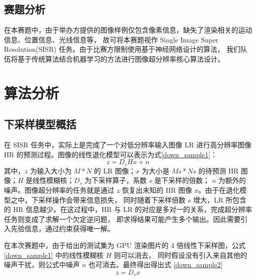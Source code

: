 \documentclass[12pt, a4paper, oneside]{ctexbook}
\begin{document}
	\subsection{赛题分析}
	在本赛题中，由于举办方提供的图像样例仅包含像素信息，缺失了渲染相关的运动信息、位置信息、光线信息等，
	故可将本赛题视作 Single Image Super Resolution(SISR) 任务。由于比赛方限制使用基于神经网络设计的算法，
	我们队伍将基于传统算法结合机器学习的方法进行图像超分辨率核心算法设计。
	
	
	\section{算法分析}
	\subsection{下采样模型概括}
	在 SISR 任务中，实际上是完成了一个对低分辨率输入图像 LR 进行高分辨率图像 HR 的预测过程。图像的线性退化模型可以表示为式\ref{down_sample1}：
	\begin{equation}
		z=D_sHx + n \label{down_sample1}
	\end{equation}
	其中，$z$ 为输入大小为 $M*N$ 的 LR 图像；$x$ 为大小是 $Ms*Ns$ 的待预测 HR 图像；$H$ 是线性模糊核；$D_s$ 为下采样算子，系数 $s$ 是下采样的倍数； 
	$n$ 为额外的噪声。图像超分辨率的任务就是通过 $z$ 恢复出未知的 HR 图像 $x$。由于在退化模型之中，下采样操作会带来信息损失，
	同时随着下采样倍数 $s$ 增大，LR 所包含的 HR 信息越少。在这过程中，HR 与 LR 的对应是多对一的关系，完成超分辨率任务则变成了求解一个欠定逆问题，
	即求得结果可能产生多个输出。因此需要引入先验信息，通过约束获得唯一解。
	\par 在本次赛题中，由于给出的测试集为 GPU 渲染图片的 4 倍线性下采样图，公式 \ref{down_sample1} 中的线性模糊核 $H$ 则可以消去，
	同时假设没有引入来自其他的噪声干扰，则公式中噪声 $n$ 也可消去。最终得出得出式 \ref{down_sample2}
	\begin{equation}
		z=D_sx \label{down_sample2}
	\end{equation}
	
\end{document}
